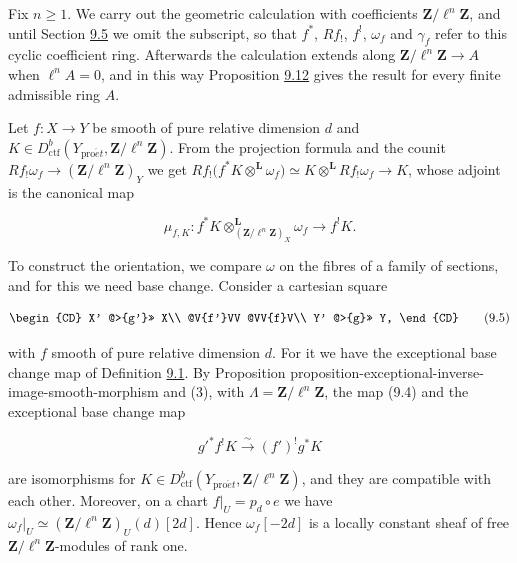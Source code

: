 \documentclass[11pt]{article}
\begin{document}
Fix \(n\geq1\). We carry out the geometric calculation with coefficients \(\mathbf Z/\ell^n\mathbf Z\), and until Section \hyperref[bp41]{9.5} we omit the subscript, so that \(f^*\), \(Rf_!\), \(f^!\), \(\omega_f\) and \(\gamma_f\) refer to this cyclic coefficient ring. Afterwards the calculation extends along \(\mathbf Z/\ell^n\mathbf Z\to A\) when \(\ell^nA=0\), and in this way Proposition \hyperref[bp39]{9.12} gives the result for every finite admissible ring \(A\).

Let \(f:X\to Y\) be smooth of pure relative dimension \(d\) and \(K\in D^b_{\mathrm{ctf}}(Y_{\mathrm{pro}\acute{e}t},\mathbf Z/\ell^n\mathbf Z)\). From the projection formula and the counit \(Rf_!\omega_{f}\to(\mathbf Z/\ell^n\mathbf Z)_{Y}\) we get \(Rf_!\bigl(f^{*}K\otimes^{\mathbf L}\omega_{f}\bigr)
\simeq K\otimes^{\mathbf L} Rf_!\omega_{f}\to K\), whose adjoint is the canonical map

\[
\mu_{f,K}:f^{*}K\otimes^{\mathbf L}_{(\mathbf Z/\ell^n\mathbf Z)_{X}}\omega_{f}
\longrightarrow f^{!}K.
\tag{9.4}
\]

To construct the orientation, we compare \(\omega\) on the fibres of a family of sections, and for this we need base change. Consider a cartesian square

\[
\begin{CD}
X' @>{g'}>> X\\
@V{f'}VV @VV{f}V\\
Y' @>{g}>> Y,
\end{CD}
\tag{9.5}
\]

with \(f\) smooth of pure relative dimension \(d\). For it we have the exceptional base change map of Definition \hyperref[bp7]{9.1}. By Proposition proposition-exceptional-inverse-image-smooth-morphism and (3), with \(\Lambda=\mathbf Z/\ell^n\mathbf Z\), the map (9.4) and the exceptional base change map

\[
g'^{*}f^{!}K\xrightarrow{\sim}(f')^{!}g^{*}K
\tag{9.6}
\]

are isomorphisms for \(K\in D^b_{\mathrm{ctf}}(Y_{\mathrm{pro}\acute{e}t},\mathbf Z/\ell^n\mathbf Z)\), and they are compatible with each other. Moreover, on a chart \(f|_U=p_d\circ e\) we have \(\omega_f|_U\simeq(\mathbf Z/\ell^n\mathbf Z)_U(d)[2d]\). Hence \(\omega_f[-2d]\) is a locally constant sheaf of free \(\mathbf Z/\ell^n\mathbf Z\)-modules of rank one.


\end{document}
